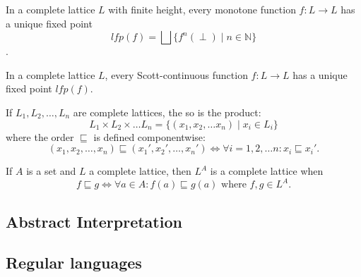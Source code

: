 \begin{theorem}\label{thm:kleene_finite}
    In a complete lattice $L$ with finite height, every monotone function $f : L \rightarrow L$ has a unique fixed point
    \begin{equation*}
        lfp(f) = \bigsqcup\{f^n(\perp) \mid n \in \mathbb{N}\}
    \end{equation*}.
\end{theorem}

\begin{theorem}\label{thm:kleene_scott}
    In a complete lattice $L$, every Scott-continuous function $f : L \rightarrow L$ has a unique fixed point $lfp(f)$.
\end{theorem}

\begin{theorem}
    If $L_1, L_2, \dots, L_n$ are complete lattices, the so is the product:
    \begin{equation*}
        L_1 \times L_2 \times \dots L_n = \{(x_1, x_2, \dots x_n) \mid x_i \in L_i\}
    \end{equation*}
    where the order $\sqsubseteq$ is defined componentwise:
    \begin{equation*}
        (x_1, x_2, \dots, x_n) \sqsubseteq (x_1', x_2', \dots, x_n')
        \iff
        \forall i = 1, 2, \dots n : x_i \sqsubseteq x_i'.
    \end{equation*}
\end{theorem}

\begin{theorem}
    If $A$ is a set and $L$ a complete lattice, then $L^A$ is a complete lattice when
    \begin{equation}
        f \sqsubseteq g \iff \forall a \in A : f(a) \sqsubseteq g(a) \text{ where } f,g \in L^A.
    \end{equation}

\end{theorem}


\subsection{Abstract Interpretation}

\subsection{Regular languages}



